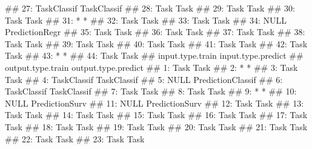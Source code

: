 \documentclass[
  11pt,
  parskip=half,
  DIV=calc,
  BCOR=10mm,
  x11names]{scrbook}
\newenvironment{Shaded}{}{}
\newcommand{\NormalTok}[1]{#1}
\begin{document}
\begin{Shaded}
\begin{Highlighting}[]
\NormalTok{## 27:      TaskClassif                   TaskClassif}
\NormalTok{## 28:             Task                          Task}
\NormalTok{## 29:             Task                          Task}
\NormalTok{## 30:             Task                          Task}
\NormalTok{## 31:                *                             *}
\NormalTok{## 32:             Task                          Task}
\NormalTok{## 33:             Task                          Task}
\NormalTok{## 34:             NULL                PredictionRegr}
\NormalTok{## 35:             Task                          Task}
\NormalTok{## 36:             Task                          Task}
\NormalTok{## 37:             Task                          Task}
\NormalTok{## 38:             Task                          Task}
\NormalTok{## 39:             Task                          Task}
\NormalTok{## 40:             Task                          Task}
\NormalTok{## 41:             Task                          Task}
\NormalTok{## 42:             Task                          Task}
\NormalTok{## 43:                *                             *}
\NormalTok{## 44:             Task                          Task}
\NormalTok{##     input.type.train            input.type.predict}
\NormalTok{##     output.type.train output.type.predict}
\NormalTok{##  1:              Task                Task}
\NormalTok{##  2:                 *                   *}
\NormalTok{##  3:              Task                Task}
\NormalTok{##  4:       TaskClassif         TaskClassif}
\NormalTok{##  5:              NULL   PredictionClassif}
\NormalTok{##  6:       TaskClassif         TaskClassif}
\NormalTok{##  7:              Task                Task}
\NormalTok{##  8:              Task                Task}
\NormalTok{##  9:                 *                   *}
\NormalTok{## 10:              NULL      PredictionSurv}
\NormalTok{## 11:              NULL      PredictionSurv}
\NormalTok{## 12:              Task                Task}
\NormalTok{## 13:              Task                Task}
\NormalTok{## 14:              Task                Task}
\NormalTok{## 15:              Task                Task}
\NormalTok{## 16:              Task                Task}
\NormalTok{## 17:              Task                Task}
\NormalTok{## 18:              Task                Task}
\NormalTok{## 19:              Task                Task}
\NormalTok{## 20:              Task                Task}
\NormalTok{## 21:              Task                Task}
\NormalTok{## 22:              Task                Task}
\NormalTok{## 23:              Task                Task}

\end{Highlighting}
\end{Shaded}
\end{document}
